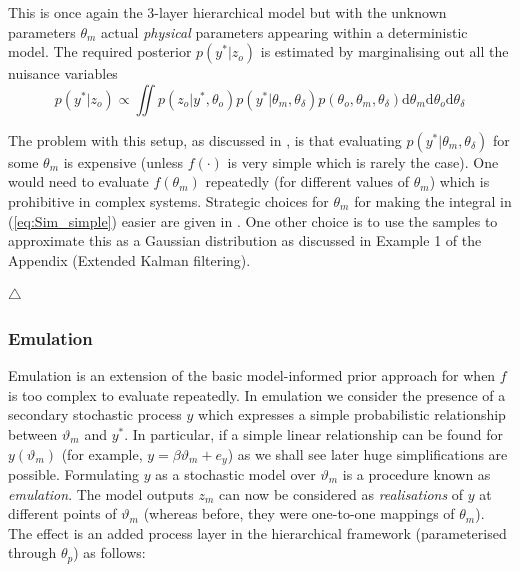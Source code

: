 \documentclass[10pt,a4paper]{article}
\newcommand\xqed[1]{%
  \leavevmode\unskip\penalty9999 \hbox{}\nobreak\hfill
  \quad\hbox{#1}}
\newcommand\demo{\xqed{$\triangle$}}
\newcommand{\intd} {\textrm{d}}
\begin{document}
\noindent This is once again the 3-layer hierarchical model but with the unknown parameters $\theta_m$ actual \emph{physical} parameters appearing within a deterministic model. The required posterior $p(y^* | z_o)$ is estimated by marginalising out all the nuisance variables
\begin{equation}\label{eq:Sim_simple}
p(y^*|z_o) \propto \iint p(z_o | y^*, \theta_o)p(y^* |\theta_m, \theta_\delta)p(\theta_o, \theta_m, \theta_\delta) \intd \theta_m \intd\theta_o \intd\theta_\delta
\end{equation}

The problem with this setup, as discussed in \citep{Higdon_2004}, is that evaluating $p(y^* | \theta_m, \theta_\delta)$ for some $\theta_m$ is expensive (unless $f(\cdot)$ is very simple which is rarely the case). One would need to evaluate $f(\theta_m)$ repeatedly (for different values of $\theta_m$) which is  prohibitive in complex systems. Strategic choices for $\theta_m$ for making the integral in (\ref{eq:Sim_simple}) easier are given in \cite{Rougier_2007}. One other choice is to use the samples to approximate this as a Gaussian distribution as discussed in Example 1 of the Appendix (Extended Kalman filtering).


\demo


\subsubsection*{Emulation}

Emulation is an extension of the basic model-informed prior approach for when $f$ is too complex to evaluate repeatedly. In emulation we consider the presence of a secondary stochastic process $y$ which expresses a simple probabilistic relationship between $\vartheta_m$ and $y^*$. In particular, if a simple linear relationship can be found for $y(\vartheta_m)$ (for example, $y = \beta\vartheta_m + e_y$) as we shall see later huge simplifications are possible. Formulating $y$ as a stochastic model over $\vartheta_m$ is a procedure known as \emph{emulation}. The model outputs $z_m$ can now be considered as \emph{realisations} of $y$ at different points of $\vartheta_m$ (whereas before, they were one-to-one mappings of $\theta_m$). The effect is an added process layer in the hierarchical framework (parameterised through $\theta_p$) as follows:
\end{document}
